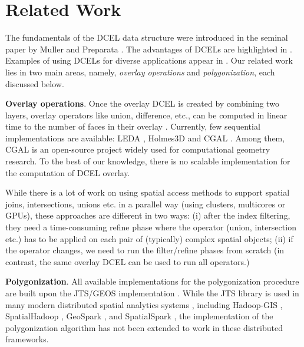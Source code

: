 \section{Related Work}\label{sec:related}
The fundamentals of the DCEL data structure were introduced in the seminal paper by Muller and Preparata  \cite{muller_finding_1978}. The advantages of DCELs are highlighted in \cite{preparata_computational_1985, berg_computational_2008}. Examples of using DCELs for diverse applications appear in \cite{barequet_dcel_1998, boltcheva_topological-based_2020, freiseisen_colored_1998}.
Our related work lies in two main areas, namely, \textit{overlay operations} and \textit{polygonization}, each discussed below.

\textbf{Overlay operations}.
Once the overlay DCEL is created by combining two layers, overlay operators like union, difference, etc., can be computed in linear time to the number of faces in their overlay \cite{freiseisen_colored_1998}. 
Currently, few sequential implementations are available: LEDA \cite{mehlhorn_leda_1995}, Holmes3D
\cite{holmes_dcel_2021} and CGAL \cite{fogel_cgal_2012}. Among them, CGAL is an open-source project widely used for computational geometry research. To the best of our knowledge, there is no scalable implementation for the computation of DCEL overlay.

While there is a lot of work on using spatial access methods to support spatial joins, intersections, unions etc. in a parallel way (using clusters, multicores or GPUs), \cite{challa_dd-rtree_2016, sabek_spatial_2017, li_scalable_2019, franklin_data_2018, magalhaes_fast_2015, puri_efficient_2013, puri_mapreduce_2013} these approaches are different in two ways: (i) after the index filtering, they need a time-consuming refine phase where the operator (union, intersection etc.) has to be applied on each pair of (typically) complex spatial objects; (ii) if the operator changes, we need to run the filter/refine phases from scratch (in contrast, the same overlay DCEL can be used to run all operators.)

\vspace{4pt}

\textbf{Polygonization}.
All available implementations for the polygonization procedure are built upon the JTS/GEOS implementation \cite{web:jts:polygonizer, web:geos:polygonizer}. 
While the JTS library is used in many modern distributed spatial analytics systems \cite{pandey_how_2021}, including Hadoop-GIS \cite{aji_hadoop-gis_2013}, 
SpatialHadoop 
\cite{eldawy_spatialhadoop_2015}, 
GeoSpark \cite{yu_spatial_2018}, and SpatialSpark \cite{you_large-scale_2015}, the implementation of the polygonization algorithm \cite{web:jts:polygonizer} has 
not been extended to 
work in these distributed frameworks.


